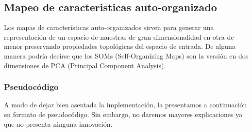 \documentclass[informe.tex]{subfiles}
\begin{document}
    \subsection{Mapeo de caracteristicas auto-organizado}
	Los mapas de características auto-organizados sirven para generar una representación de un espacio de muestras de gran dimensionalidad en otra de menor preservando propiedades topológicas del espacio de entrada. De alguna manera podr\'ia decirse que los SOMs (Self-Organizing Maps) son la versión en dos dimensiones de PCA (Principal Component Analysis).
	
	\subsubsection{Pseudoc\'odigo}
	
	A modo de dejar bien asentada la implementación, la presentamos a continuación en formato de pseudocódigo. Sin embargo, no daremos mayores explicaciones ya que no presenta ninguna innovación.
	
	\vspace{10pt}
	
\end{document}
